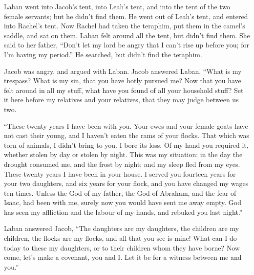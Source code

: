  Laban went into Jacob's tent, into Leah's tent, and into
the tent of the two female servants; but he didn't find them. He went
out of Leah's tent, and entered into Rachel's tent.  Now
Rachel had taken the teraphim, put them in the camel's saddle, and sat
on them. Laban felt around all the tent, but didn't find them.
 She said to her father, ``Don't let my lord be angry
that I can't rise up before you; for I'm having my period.'' He
searched, but didn't find the teraphim.

 Jacob was angry, and argued with Laban. Jacob answered
Laban, ``What is my trespass? What is my sin, that you have hotly
pursued me?  Now that you have felt around in all my
stuff, what have you found of all your household stuff? Set it here
before my relatives and your relatives, that they may judge between us
two.

 ``These twenty years I have been with you. Your ewes and
your female goats have not cast their young, and I haven't eaten the
rams of your flocks.  That which was torn of animals, I
didn't bring to you. I bore its loss. Of my hand you required it,
whether stolen by day or stolen by night.  This was my
situation: in the day the drought consumed me, and the frost by night;
and my sleep fled from my eyes.  These twenty years I
have been in your house. I served you fourteen years for your two
daughters, and six years for your flock, and you have changed my wages
ten times.  Unless the God of my father, the God of
Abraham, and the fear of Isaac, had been with me, surely now you would
have sent me away empty. God has seen my affliction and the labour of my
hands, and rebuked you last night.''

 Laban answered Jacob, ``The daughters are my daughters,
the children are my children, the flocks are my flocks, and all that you
see is mine! What can I do today to these my daughters, or to their
children whom they have borne?  Now come, let's make a
covenant, you and I. Let it be for a witness between me and you.''

